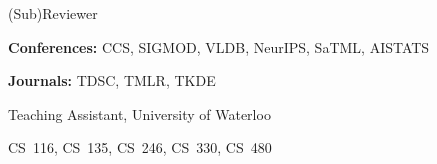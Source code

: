 
\begin{cventries2}

  \cventrynew
    {(Sub)Reviewer}
    {} 
    {
      \begin{cvitems}
        \item \textbf{Conferences:} CCS, SIGMOD, VLDB, NeurIPS, SaTML, AISTATS
        \item \textbf{Journals:} TDSC, TMLR, TKDE
      \end{cvitems}
    }

  \cventrynew
    {Teaching Assistant, University of Waterloo}
    {} 
    {
      \begin{cvitems}
        \item CS~116, CS~135, CS~246, CS~330, CS~480
      \end{cvitems}
    }

\end{cventries2}
